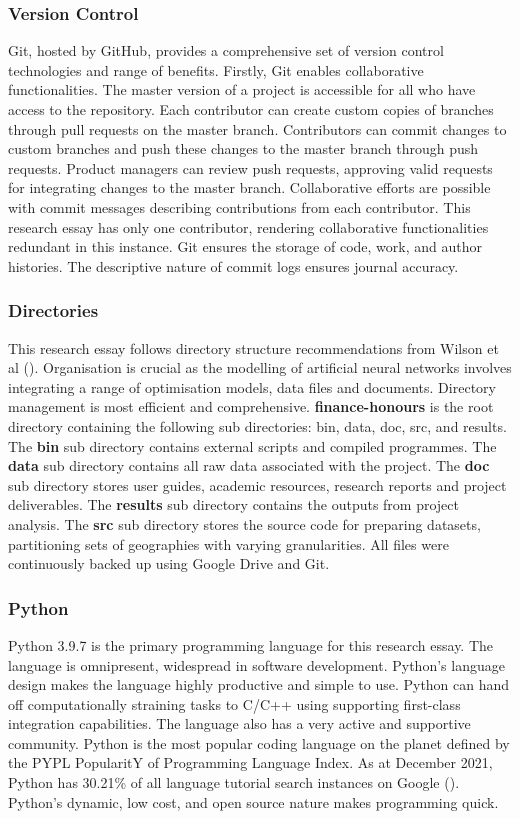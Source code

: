 \documentclass[12pt]{article}
\begin{document}
\subsubsection{Version Control}\label{Version Control}
Git, hosted by GitHub, provides a comprehensive set of version control technologies and range of benefits.
Firstly, Git enables collaborative functionalities. 
The master version of a project is accessible for all who have access to the repository. 
Each contributor can create custom copies of branches through pull requests on the master branch. 
Contributors can commit changes to custom branches and push these changes to the master branch through push requests. 
Product managers can review push requests, approving valid requests for integrating changes to the master branch. 
Collaborative efforts are possible with commit messages describing contributions from each contributor. 
This research essay has only one contributor, rendering collaborative functionalities redundant in this instance.
Git ensures the storage of code, work, and author histories.
The descriptive nature of commit logs ensures journal accuracy.

\subsubsection{Directories}
This research essay follows directory structure recommendations from Wilson et al (\citeyear{J:10}). 
Organisation is crucial as the modelling of artificial neural networks involves integrating a range of optimisation models, data files and documents.  
Directory management is most efficient and comprehensive. 
\textbf{finance-honours} is the root directory containing the following sub directories: bin, data, doc, src, and results.  
The \textbf{bin} sub directory contains external scripts and compiled programmes. 
The \textbf{data} sub directory contains all raw data associated with the project. 
The \textbf{doc} sub directory stores user guides, academic resources, research reports and project deliverables.
The \textbf{results} sub directory contains the outputs from project analysis.
The \textbf{src} sub directory stores the source code for preparing datasets, partitioning sets of geographies with varying granularities.
All files were continuously backed up using Google Drive and Git.

\subsubsection{Python}\label{python}
Python 3.9.7 is the primary programming language for this research essay. 
The language is omnipresent, widespread in software development. 
Python's language design makes the language highly productive and simple to use. 
Python can hand off computationally straining tasks to C/C++ using supporting first-class integration capabilities.
The language also has a very active and supportive community.
Python is the most popular coding language on the planet defined by the PYPL PopularitY of Programming Language Index. 
As at December 2021, Python has 30.21\% of all language tutorial search instances on Google (\cite{PYPL_Pop}).
 Python's dynamic, low cost, and open source nature makes programming quick.
\end{document}
